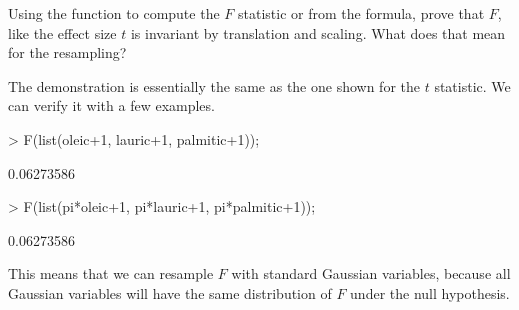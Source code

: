 \documentclass[a4paper]{article}
\theoremstyle{definition}
\begin{document}
\begin{Exercise}
Using the function to compute the $F$ statistic or from the formula,
prove that $F$, like the effect size $t$ is invariant by translation
and scaling. What does that mean for the resampling?
\end{Exercise}
\begin{Answer}
The demonstration is essentially the same as the one shown for the $t$
statistic. We can verify it with a few examples.
\begin{Schunk}
\begin{Sinput}
> F(list(oleic+1, lauric+1, palmitic+1));
\end{Sinput}
\begin{Soutput}
[1] 0.06273586
\end{Soutput}
\begin{Sinput}
> F(list(pi*oleic+1, pi*lauric+1, pi*palmitic+1));
\end{Sinput}
\begin{Soutput}
[1] 0.06273586
\end{Soutput}
\end{Schunk}
This means that we can resample $F$ with standard Gaussian variables,
because all Gaussian variables will have the same distribution of $F$
under the null hypothesis.
\end{Answer}
\end{document}
